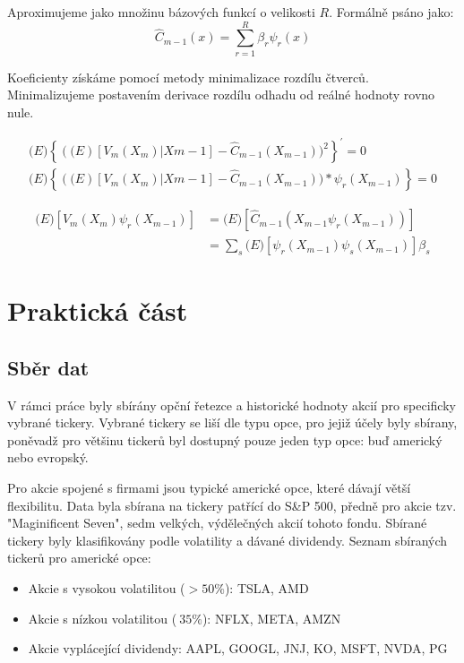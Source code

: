 \documentclass[male,czech,api_bc]{kitheses}
\begin{document}
  Aproximujeme jako množinu bázových funkcí o velikosti $R$. Formálně psáno jako:
  $$ \hat{C}_{m-1}(x) = \sum\limits^R_{r=1} \beta_r \psi_r (x) $$

  Koeficienty získáme pomocí metody minimalizace rozdílu čtverců. Minimalizujeme postavením derivace rozdílu odhadu od reálné hodnoty rovno nule.

  \begin{gather}
    \mathbb(E)\left\{ (\mathbb(E)[V_m(X_m) | X{m-1}] - \hat{C}_{m-1}(X_{m-1}))^2 \right\}^\prime = 0 \\
    \mathbb(E)\left\{ (\mathbb(E)[V_m(X_m) | X{m-1}] - \hat{C}_{m-1}(X_{m-1})) * \psi_r(X_{m-1}) \right\} = 0
  \end{gather}

  \begin{align*}
    \mathbb(E) [V_m(X_m) \psi_r(X_{m-1})] &= \mathbb(E)[\hat{C}_{m-1}(X_{m-1} \psi_r (X_{m-1}))] \\
     &= \sum\limits_s\mathbb(E)[\psi_r(X_{m-1})\psi_s(X_{m-1})]\beta_s
  \end{align*}

  \chapter{Praktická část}

  \section{Sběr dat}

  V rámci práce byly sbírány opční řetezce a historické hodnoty akcií pro specificky vybrané tickery.
  Vybrané tickery se liší dle typu opce, pro jejiž účely byly sbírany, poněvadž pro většinu tickerů byl dostupný pouze jeden typ opce: buď americký nebo evropský.

  Pro akcie spojené s firmami jsou typické americké opce, které dávají větší flexibilitu. Data byla sbírana na tickery patřící do S\&P 500, předně pro akcie tzv. "Maginificent Seven", sedm velkých, výdělečných akcií tohoto fondu. Sbírané tickery byly klasifikovány podle volatility a dávané dividendy. Seznam sbíraných tickerů pro americké opce: 
  \begin{itemize}
    \item{Akcie s vysokou volatilitou ($ > 50\% $): TSLA, AMD}
    \item{Akcie s nízkou volatilitou ($~35\%$): NFLX, META, AMZN}
    \item{Akcie vyplácející dividendy: AAPL, GOOGL, JNJ, KO, MSFT, NVDA, PG}
  \end{itemize}
\end{document}
